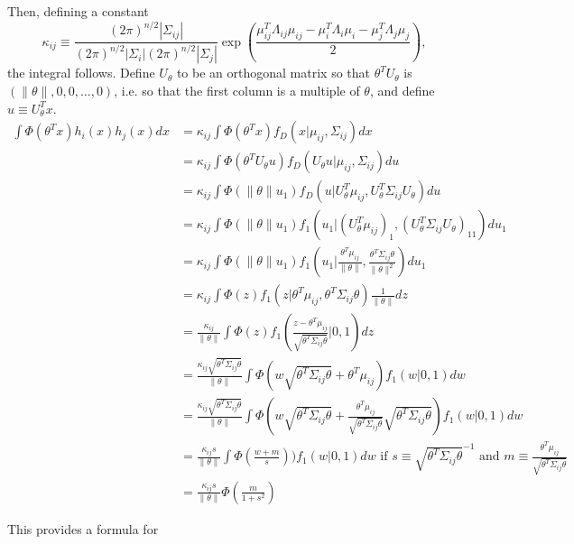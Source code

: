 \documentclass{article}
\begin{document}
Then, defining a constant 
$$
\kappa_{ij} \equiv \frac{(2\pi)^{n/2}|\Sigma_{ij}|}{(2\pi)^{n/2}|\Sigma_i|(2\pi)^{n/2}|\Sigma_j|}
\exp(\frac{
	\mu_{ij}^T\Lambda_{ij}\mu_{ij}
	-\mu_i^T\Lambda_i\mu_i-\mu_j^T\Lambda_j\mu_j
}{2})
,$$
 the integral follows. Define $U_{\theta}$ to be an orthogonal matrix so that $\theta^T U_{\theta}$ is $(\|\theta\|, 0, 0, ...,0 )$, i.e. so that the first column is a multiple of $\theta$, and define $u \equiv U_{\theta}^Tx$. 
\begin{align*}
\int \Phi(\theta ^T x)h_i(x)h_j(x)dx &=
\kappa_{ij} \int \Phi(\theta ^T x)  f_D(x|\mu_{ij}, \Sigma_{ij})dx\\
&=
\kappa_{ij} \int \Phi(\theta ^T U_{\theta}u) f_D(U_{\theta}u|\mu_{ij}, \Sigma_{ij})du\\
&=
\kappa_{ij} \int \Phi(\|\theta\|u_1) f_D(u|U_{\theta}^T\mu_{ij}, U_{\theta}^T\Sigma_{ij}U_{\theta})du\\
&=
\kappa_{ij} \int \Phi(\|\theta\|u_1) f_1(u_1|(U_{\theta}^T\mu_{ij})_1, (U_{\theta}^T\Sigma_{ij}U_{\theta})_{11})du_1\\
&=
\kappa_{ij} \int \Phi(\|\theta\|u_1) f_1(u_1|\frac{\theta^T\mu_{ij}}{\|\theta\|}, \frac{\theta^T\Sigma_{ij}\theta}{\|\theta\|^2})du_1\\
&=
\kappa_{ij} \int \Phi(z) f_1(z|{\theta^T\mu_{ij}}, {\theta^T\Sigma_{ij}\theta})\frac{1}{\|\theta\|}dz\\
&=
\frac{\kappa_{ij} }{\|\theta\|}\int \Phi(z) f_1(\frac{z - {\theta^T\mu_{ij}}}{\sqrt{\theta^T\Sigma_{ij}\theta}}|0,1)dz\\
&=
\frac{\kappa_{ij}\sqrt{\theta^T\Sigma_{ij}\theta} }{\|\theta\|}\int  \Phi(w\sqrt{\theta^T\Sigma_{ij}\theta}+  \theta^T\mu_{ij})f_1(w|0,1)dw\\
&=
\frac{\kappa_{ij}\sqrt{\theta^T\Sigma_{ij}\theta} }{\|\theta\|}\int  \Phi(
	w\sqrt{\theta^T\Sigma_{ij}\theta}+  		
	\frac{\theta^T\mu_{ij}}		
	{\sqrt{\theta^T\Sigma_{ij}\theta}}
	\sqrt{\theta^T\Sigma_{ij}\theta}
)f_1(w|0,1)dw\\
&=
\frac{\kappa_{ij}s}{\|\theta\|}\int  \Phi(\frac{w+m}{s})
)f_1(w|0,1)dw \text{ if $s\equiv	\sqrt{\theta^T\Sigma_{ij}\theta}^{-1}$ and $m\equiv 	\frac{\theta^T\mu_{ij}}		
 {\sqrt{\theta^T\Sigma_{ij}\theta}}$}\\
&=
\frac{\kappa_{ij}s }{\|\theta\|}  \Phi(\frac{m}{1+s^2})
\end{align*}

This provides a formula for 

\end{document}
